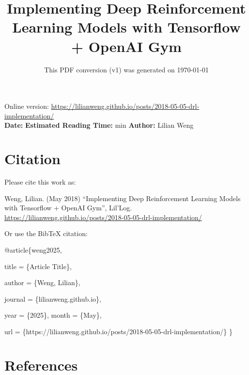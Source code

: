 \documentclass[12pt]{article}
\title{Implementing Deep Reinforcement Learning Models with Tensorflow + OpenAI Gym}
\date{This PDF conversion (v1) was generated on \today\footnotemark}
\begin{document}
\maketitle
\begin{center}
    Online version: \url{https://lilianweng.github.io/posts/2018-05-05-drl-implementation/} \\
    \textbf{Date:} \quad
    \textbf{Estimated Reading Time:}  min \quad
    \textbf{Author:} Lilian Weng
\end{center}




\newpage
\tableofcontents
\newpage
\vspace{1em}
\n\n\n\section{Citation}
Please cite this work as:

\begin{tcolorbox}[colback=black!5!white, colframe=black!80!white, boxrule=0.5pt, arc=2mm, left=1mm, right=1mm, top=1mm, bottom=1mm]
  Weng, Lilian. (May 2018) ``Implementing Deep Reinforcement Learning Models with Tensorflow + OpenAI Gym'', Lil'Log. \url{https://lilianweng.github.io/posts/2018-05-05-drl-implementation/}
  \end{tcolorbox}

Or use the BibTeX citation:

\begin{tcolorbox}[
    colback=black!5!white,
    colframe=black!80!white,
    boxrule=0.5pt,
    arc=2mm,
    left=1mm,
    right=1mm,
    top=1mm,
    bottom=1mm,
    listing only,
    listing options={
      basicstyle=\ttfamily\footnotesize,
      breaklines=true,
      literate={\{}{{\char`\{}}1 {\}}{{\char`\}}}1
    }
  ]
  @article\{weng2025,

    title   = \{Article Title\},

    author  = \{Weng, Lilian\},

    journal = \{lilianweng.github.io\},

    year    = \{2025\},
    month   = \{May\},

    url     = \{https://lilianweng.github.io/posts/2018-05-05-drl-implementation/\}\n
  \}
  \end{tcolorbox}

\newpage
\section{References}

\n
\end{document}
